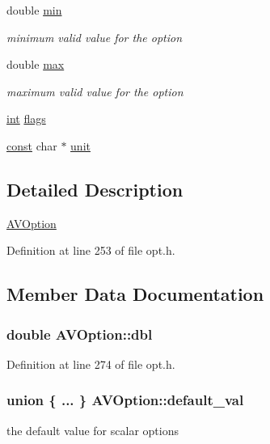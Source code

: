 \begin{DoxyCompactItemize}
\begin{tabbing}
\end{tabbing}\item 
double \hyperlink{struct_a_v_option_aaf1937648549dce7a4be35268a359a19}{min}
\begin{DoxyCompactList}\small\item\em minimum valid value for the option \end{DoxyCompactList}\item 
double \hyperlink{struct_a_v_option_a078ff8d3707143690d7d59d87d4706f4}{max}
\begin{DoxyCompactList}\small\item\em maximum valid value for the option \end{DoxyCompactList}\item 
\hyperlink{xmltok_8h_a5a0d4a5641ce434f1d23533f2b2e6653}{int} \hyperlink{struct_a_v_option_ae6b670af4b2c7819c35437cab61c2745}{flags}
\item 
\hyperlink{getopt1_8c_a2c212835823e3c54a8ab6d95c652660e}{const} char $\ast$ \hyperlink{struct_a_v_option_a248d65a7cab7d7bd3a4eb51212ab0e49}{unit}
\end{DoxyCompactItemize}


\subsection{Detailed Description}
\hyperlink{struct_a_v_option}{A\+V\+Option} 

Definition at line 253 of file opt.\+h.



\subsection{Member Data Documentation}
\subsubsection[{\texorpdfstring{dbl}{dbl}}]{\setlength{\rightskip}{0pt plus 5cm}double A\+V\+Option\+::dbl}\hypertarget{struct_a_v_option_afd9a2f8e983c9ee8de643621022064f0}{}\label{struct_a_v_option_afd9a2f8e983c9ee8de643621022064f0}


Definition at line 274 of file opt.\+h.

\subsubsection[{\texorpdfstring{default\+\_\+val}{default_val}}]{\setlength{\rightskip}{0pt plus 5cm}union \{ ... \}   A\+V\+Option\+::default\+\_\+val}\hypertarget{struct_a_v_option_a4e7968bd94d3e773e5fe145f919ecd9e}{}\label{struct_a_v_option_a4e7968bd94d3e773e5fe145f919ecd9e}
the default value for scalar options 
